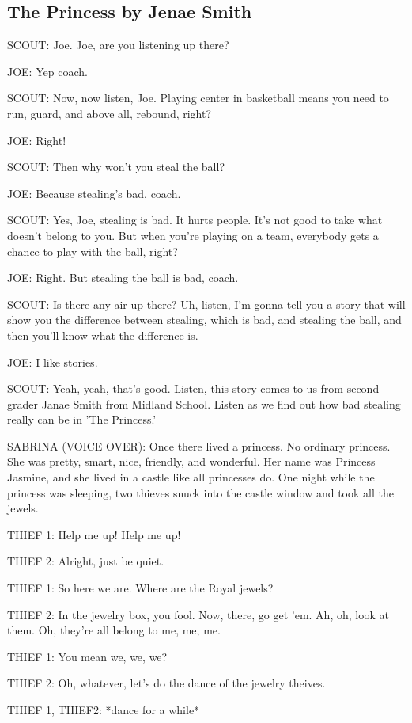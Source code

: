 \subsection{The Princess by Jenae Smith}

SCOUT:
Joe.
Joe, are you listening up there?

JOE:
Yep coach.

SCOUT:
Now, now listen, Joe.
Playing center in basketball means you need to run, guard, and above all, rebound, right?

JOE:
Right!

SCOUT:
Then why won't you steal the ball?

JOE:
Because stealing's bad, coach.

SCOUT:
Yes, Joe, stealing is bad.
It hurts people.
It's not good to take what doesn't belong to you.
But when you're playing on a team, everybody gets a chance to play with the ball, right?

JOE:
Right.
But stealing the ball is bad, coach.

SCOUT:
Is there any air up there?
Uh, listen, I'm gonna tell you a story that will show you the difference between stealing, which is bad, and stealing the ball, and then you'll know what the difference is.

JOE:
I like stories.

SCOUT:
Yeah, yeah, that's good.
Listen, this story comes to us from second grader Janae Smith from Midland School.
Listen as we find out how bad stealing really can be in 'The Princess.'

SABRINA (VOICE OVER):
Once there lived a princess.
No ordinary princess.
She was pretty, smart, nice, friendly, and wonderful.
Her name was Princess Jasmine, and she lived in a castle like all princesses do.
One night while the princess was sleeping, two thieves snuck into the castle window and took all the jewels.

THIEF 1:
Help me up!
Help me up!

THIEF 2:
Alright, just be quiet.

THIEF 1:
So here we are.
Where are the Royal jewels?

THIEF 2:
In the jewelry box, you fool.
Now, there, go get 'em.
Ah, oh, look at them.
Oh, they're all belong to me, me, me.

THIEF 1:
You mean we, we, we?

THIEF 2:
Oh, whatever, let's do the dance of the jewelry theives.

THIEF 1, THIEF2:
*dance for a while*

